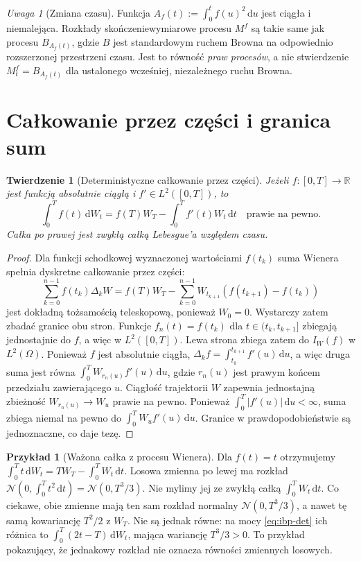\documentclass[11pt,a4paper,oneside]{report}
\numberwithin{equation}{chapter}
\theoremstyle{plain}
\newtheorem{twierdzenie}{Twierdzenie}[chapter]
\theoremstyle{definition}
\newtheorem{przyklad}{Przykład}[chapter]
\theoremstyle{remark}
\newtheorem{uwaga}{Uwaga}[chapter]
\newcommand{\R}{\mathbb{R}}
\newcommand{\dd}{\mathrm{d}}
\newcommand{\Normal}{\mathcal{N}}
\begin{document}
\begin{uwaga}[Zmiana czasu]
Funkcja $A_f(t):=\int_0^tf(u)^2\,\dd u$ jest ciągła
i niemalejąca. Rozkłady skończeniewymiarowe procesu $M^f$
są takie same jak procesu $B_{A_f(t)}$, gdzie $B$
jest standardowym ruchem Browna na odpowiednio rozszerzonej
przestrzeni czasu. Jest to równość \emph{praw procesów},
a nie stwierdzenie $M_t^f=B_{A_f(t)}$ dla ustalonego
wcześniej, niezależnego ruchu Browna.
\end{uwaga}

\section{Całkowanie przez części i granica sum}\label{sec:volIII:01:05}
\begin{twierdzenie}[Deterministyczne całkowanie przez części]\label{thm:volIII:01:05}
Jeżeli $f:[0,T]\to\R$ jest funkcją absolutnie ciągłą
i $f'\in L^2([0,T])$, to
\[
\int_0^T f(t)\,\dd W_t
=f(T)W_T-\int_0^T f'(t)W_t\,\dd t
\quad\text{prawie na pewno}.
\tag{1.6}\label{eq:ibp-det}
\]
Całka po prawej jest zwykłą całką Lebesgue'a względem czasu.
\end{twierdzenie}
\begin{proof}
Dla funkcji schodkowej wyznaczonej wartościami $f(t_k)$
suma Wienera spełnia dyskretne całkowanie przez części:
\[
\sum_{k=0}^{n-1}f(t_k)\Delta_kW
=f(T)W_T-\sum_{k=0}^{n-1}W_{t_{k+1}}(f(t_{k+1})-f(t_k))
\]
jest dokładną tożsamością teleskopową, ponieważ $W_0=0$.
Wystarczy zatem zbadać granice obu stron. Funkcje $f_n(t)=f(t_k)$ dla
$t\in(t_k,t_{k+1}]$ zbiegają jednostajnie do $f$,
a więc w $L^2([0,T])$. Lewa strona zbiega zatem do
$I_W(f)$ w $L^2(\Omega)$.
Ponieważ $f$ jest absolutnie ciągła,
$\Delta_k f=\int_{t_k}^{t_{k+1}}f'(u)\,\dd u$,
a więc druga suma jest równa
$\int_0^T W_{r_n(u)}f'(u)\,\dd u$,
gdzie $r_n(u)$ jest prawym końcem przedziału zawierającego $u$.
Ciągłość trajektorii $W$ zapewnia jednostajną zbieżność
$W_{r_n(u)}\to W_u$ prawie na pewno. Ponieważ
$\int_0^T|f'(u)|\,\dd u<\infty$, suma zbiega niemal
na pewno do $\int_0^TW_uf'(u)\,\dd u$.
Granice w prawdopodobieństwie są jednoznaczne, co daje tezę.
\end{proof}

\begin{przyklad}[Ważona całka z procesu Wienera]
Dla $f(t)=t$ otrzymujemy
$\int_0^Tt\,\dd W_t=T W_T-\int_0^TW_t\,\dd t$.
Losowa zmienna po lewej ma rozkład
$\Normal(0,\int_0^Tt^2\,\dd t)=\Normal(0,T^3/3)$.
Nie mylimy jej ze zwykłą całką $\int_0^TW_t\,\dd t$.
Co ciekawe, obie zmienne mają ten sam rozkład normalny
$\Normal(0,T^3/3)$, a nawet tę samą kowariancję
$T^2/2$ z $W_T$. Nie są jednak równe:
na mocy \eqref{eq:ibp-det} ich różnica to
$\int_0^T(2t-T)\,\dd W_t$, mająca wariancję
$T^3/3>0$. To przykład pokazujący, że jednakowy
rozkład nie oznacza równości zmiennych losowych.
\end{przyklad}
\end{document}
